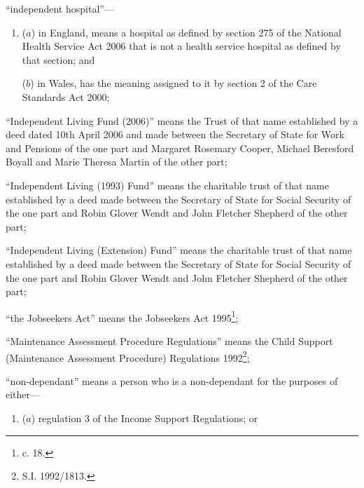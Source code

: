\documentclass[12pt,a4paper]{article}
\begin{document}
\begin{enumerate}

“independent hospital”—
\begin{enumerate}\item[]
($a$)
in England, means a hospital as defined by section 275 of the National Health Service Act 2006 that is not a health service hospital as defined by that section; and

($b$)
in Wales, has the meaning assigned to it by section 2 of the Care Standards Act 2000;
\end{enumerate}

“Independent Living Fund (2006)” means the Trust of that name established by a deed dated 10th April 2006 and made between the Secretary of State for Work and Pensions of the one part and Margaret Rosemary Cooper, Michael Beresford Boyall and Marie Theresa Martin of the other part;

“Independent Living (1993) Fund” means the charitable trust of that name established by a deed made between the Secretary of State for Social Security of the one part and Robin Glover Wendt and John Fletcher Shepherd of the other part;

“Independent Living (Extension) Fund” means the charitable trust of that name established by a deed made between the Secretary of State for Social Security of the one part and Robin Glover Wendt and John Fletcher Shepherd of the other part;

“the Jobseekers Act” means the Jobseekers Act 1995\footnote{ c. 18.};

“Maintenance Assessment Procedure Regulations” means the Child Support (Maintenance Assessment Procedure) Regulations 1992\footnote{\frenchspacing S.I. 1992/1813.};


“non-dependant” means a person who is a non-dependant for the purposes of either—
\begin{enumerate}\item[]
($a$)
regulation 3 of the Income Support Regulations; or


\end{enumerate}
\end{enumerate}
\end{document}
